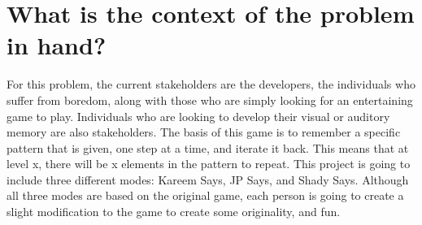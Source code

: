 \documentclass{article}
\begin{document}
\section{What is the context of the problem in hand?}

\par For this problem, the current stakeholders are the developers, the individuals who suffer from boredom, along with those who are simply looking for an entertaining game to play. Individuals who are looking to develop their visual or auditory memory are also stakeholders. The basis of this game is to remember a specific pattern that is given, one step at a time, and iterate it back. This means that at level x, there will be x elements in the pattern to repeat. This project is going to include three different modes: Kareem Says, JP Says, and Shady Says. Although all three modes are based on the original game, each person is going to create a slight modification to the game to create some originality, and fun.
\end{document}
